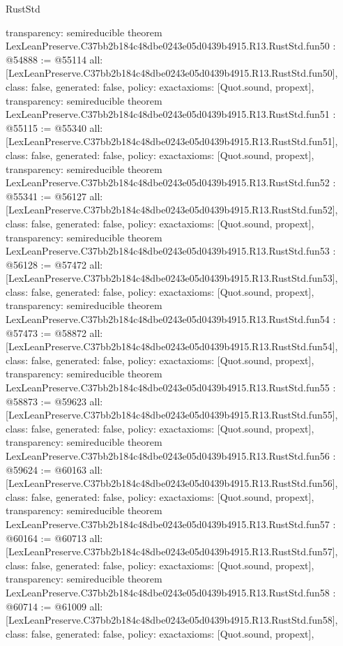 \begin{lexlean}{RustStd}
\begin{coremodule}
{  transparency: semireducible
}
theorem LexLeanPreserve.C37bb2b184c48dbe0243e05d0439b4915.R13.RustStd.fun50 : @54888 := @55114 {
  all: [LexLeanPreserve.C37bb2b184c48dbe0243e05d0439b4915.R13.RustStd.fun50],
  class: false,
  generated: false,
  policy: exact{axioms: [Quot.sound, propext]},
  transparency: semireducible
}
theorem LexLeanPreserve.C37bb2b184c48dbe0243e05d0439b4915.R13.RustStd.fun51 : @55115 := @55340 {
  all: [LexLeanPreserve.C37bb2b184c48dbe0243e05d0439b4915.R13.RustStd.fun51],
  class: false,
  generated: false,
  policy: exact{axioms: [Quot.sound, propext]},
  transparency: semireducible
}
theorem LexLeanPreserve.C37bb2b184c48dbe0243e05d0439b4915.R13.RustStd.fun52 : @55341 := @56127 {
  all: [LexLeanPreserve.C37bb2b184c48dbe0243e05d0439b4915.R13.RustStd.fun52],
  class: false,
  generated: false,
  policy: exact{axioms: [Quot.sound, propext]},
  transparency: semireducible
}
theorem LexLeanPreserve.C37bb2b184c48dbe0243e05d0439b4915.R13.RustStd.fun53 : @56128 := @57472 {
  all: [LexLeanPreserve.C37bb2b184c48dbe0243e05d0439b4915.R13.RustStd.fun53],
  class: false,
  generated: false,
  policy: exact{axioms: [Quot.sound, propext]},
  transparency: semireducible
}
theorem LexLeanPreserve.C37bb2b184c48dbe0243e05d0439b4915.R13.RustStd.fun54 : @57473 := @58872 {
  all: [LexLeanPreserve.C37bb2b184c48dbe0243e05d0439b4915.R13.RustStd.fun54],
  class: false,
  generated: false,
  policy: exact{axioms: [Quot.sound, propext]},
  transparency: semireducible
}
theorem LexLeanPreserve.C37bb2b184c48dbe0243e05d0439b4915.R13.RustStd.fun55 : @58873 := @59623 {
  all: [LexLeanPreserve.C37bb2b184c48dbe0243e05d0439b4915.R13.RustStd.fun55],
  class: false,
  generated: false,
  policy: exact{axioms: [Quot.sound, propext]},
  transparency: semireducible
}
theorem LexLeanPreserve.C37bb2b184c48dbe0243e05d0439b4915.R13.RustStd.fun56 : @59624 := @60163 {
  all: [LexLeanPreserve.C37bb2b184c48dbe0243e05d0439b4915.R13.RustStd.fun56],
  class: false,
  generated: false,
  policy: exact{axioms: [Quot.sound, propext]},
  transparency: semireducible
}
theorem LexLeanPreserve.C37bb2b184c48dbe0243e05d0439b4915.R13.RustStd.fun57 : @60164 := @60713 {
  all: [LexLeanPreserve.C37bb2b184c48dbe0243e05d0439b4915.R13.RustStd.fun57],
  class: false,
  generated: false,
  policy: exact{axioms: [Quot.sound, propext]},
  transparency: semireducible
}
theorem LexLeanPreserve.C37bb2b184c48dbe0243e05d0439b4915.R13.RustStd.fun58 : @60714 := @61009 {
  all: [LexLeanPreserve.C37bb2b184c48dbe0243e05d0439b4915.R13.RustStd.fun58],
  class: false,
  generated: false,
  policy: exact{axioms: [Quot.sound, propext]},
}
\end{coremodule}
\end{lexlean}

